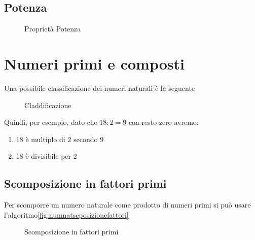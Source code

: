\subsection{Potenza}
\label{sec:NumerinatPot}
\begin{figure} %
	\centering

	\caption{Proprietà Potenza}
	\label{fig:ProprietaPotenza}\end{figure}
\section{Numeri primi e composti}
\label{sec:Numeriprimiecomposti}
Una possibile classificazione dei numeri naturali è la seguente
\begin{figure} %
	\centering

	\caption{Claddificazione}
	\label{fig:ProprietaClassificazioneNumNat}\end{figure}
Quindi, per esempio, dato che $18:2=9$ con resto zero avremo:
\begin{enumerate}
	\item 18 è multiplo di 2 secondo 9
	\item 18 è divisibile per 2
\end{enumerate}
\subsection{Scomposizione in fattori primi}
Per scomporre un numero naturale come prodotto di numeri primi  si può usare  l'algoritmo\nobs\vref{fig:numnatscposizionefattori}
	
\begin{figure}
\centering
{}
	\caption{Scomposizione in fattori primi}
	\label{fig:numnatscposizionefattori}
\end{figure}
	
